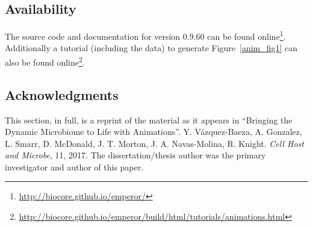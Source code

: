 \subsection{Availability}
The source code and documentation for version 0.9.60 can be found online\footnote{\url{http://biocore.github.io/emperor/}}. Additionally a tutorial (including the data) to generate Figure~\ref{anim_fig1} can also be found online\footnote{\url{http://biocore.github.io/emperor/build/html/tutorials/animations.html}}. 

\subsection{Acknowledgments}

This section, in full, is a reprint of the material as it appears in ``Bringing 
the Dynamic Microbiome to Life with Animations''.  Y.  V\'azquez-Baeza, A.  
Gonzalez, L. Smarr, D.  McDonald, J.  T. Morton, J.  A.  Navas-Molina, R.  
Knight. \emph{Cell Host and Microbe}, 11, 2017. The dissertation/thesis author 
was the primary investigator and author of this paper.
